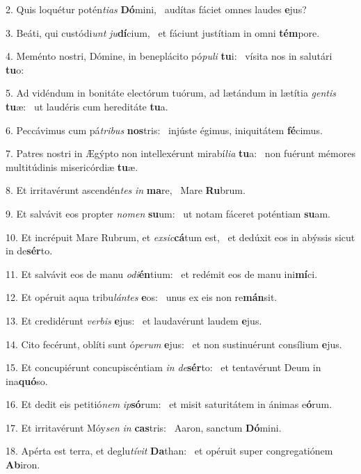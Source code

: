 2. Quis loquétur potén\textit{ti}\textit{as} \textbf{Dó}mini, \ast\  audítas fáciet omnes laudes \textbf{e}jus?\

3. Beáti, qui custódi\textit{unt} \textit{ju}\textbf{dí}cium, \ast\  et fáciunt justítiam in omni \textbf{tém}pore.\

4. Meménto nostri, Dómine, in beneplácito pó\textit{pu}\textit{li} \textbf{tu}i: \ast\  vísita nos in salutári \textbf{tu}o:\

5. Ad vidéndum in bonitáte electórum tuórum, ad lætándum in lætítia \textit{gen}\textit{tis} \textbf{tu}æ: \ast\  ut laudéris cum hereditáte \textbf{tu}a.\

6. Peccávimus cum pá\textit{tri}\textit{bus} \textbf{nos}tris: \ast\  injúste égimus, iniquitátem \textbf{fé}cimus.\

7. Patres nostri in Ægýpto non intellexérunt mirabí\textit{li}\textit{a} \textbf{tu}a: \ast\  non fuérunt mémores multitúdinis misericórdiæ \textbf{tu}æ.\

8. Et irritavérunt ascendén\textit{tes} \textit{in} \textbf{ma}re, \ast\  Mare \textbf{Ru}brum.\

9. Et salvávit eos propter \textit{no}\textit{men} \textbf{su}um: \ast\  ut notam fáceret poténtiam \textbf{su}am.\

10. Et incrépuit Mare Rubrum, et \textit{ex}\textit{sic}\textbf{cá}tum est, \ast\  et dedúxit eos in abýssis sicut in de\textbf{sér}to.\

11. Et salvávit eos de manu \textit{o}\textit{di}\textbf{én}tium: \ast\  et redémit eos de manu ini\textbf{mí}ci.\

12. Et opéruit aqua tribu\textit{lán}\textit{tes} \textbf{e}os: \ast\  unus ex eis non re\textbf{mán}sit.\

13. Et credidérunt \textit{ver}\textit{bis} \textbf{e}jus: \ast\  et laudavérunt laudem \textbf{e}jus.\

14. Cito fecérunt, oblíti sunt ó\textit{pe}\textit{rum} \textbf{e}jus: \ast\  et non sustinuérunt consílium \textbf{e}jus.\

15. Et concupiérunt concupiscéntiam \textit{in} \textit{de}\textbf{sér}to: \ast\  et tentavérunt Deum in ina\textbf{quó}so.\

16. Et dedit eis petitió\textit{nem} \textit{ip}\textbf{só}rum: \ast\  et misit saturitátem in ánimas e\textbf{ó}rum.\

17. Et irritavérunt Móy\textit{sen} \textit{in} \textbf{cas}tris: \ast\  Aaron, sanctum \textbf{Dó}mini.\

18. Apérta est terra, et deglu\textit{tí}\textit{vit} \textbf{Da}than: \ast\  et opéruit super congregatiónem \textbf{Ab}iron.\

